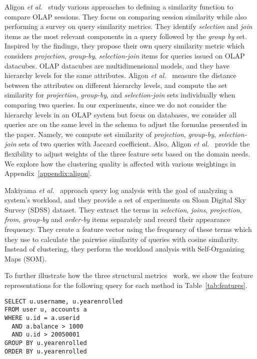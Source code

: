 Aligon \textit{et al.}~\cite{aligon2014similarity} study various approaches to defining a similarity function to compare OLAP sessions.
They focus on comparing session similarity while also performing a survey on query similarity metrics.
They identify \textit{selection} and \textit{join} items as the most relevant components in a query followed by the \textit{group by} set.
Inspired by the findings, they propose their own query similarity metric which considers \textit{projection}, \textit{group-by}, \textit{selection-join} items for queries issued on OLAP datacubes. 
OLAP datacubes are multidimensional models, and they have hierarchy levels for the same attributes. Aligon \textit{et al.}~\cite{aligon2014similarity} measure the distance between the attributes on different hierarchy levels, and compute the set similarity for \textit{projection}, \textit{group-by}, and \textit{selection-join} sets individually when comparing two queries.
In our experiments, since we do not consider the hierarchy levels in an OLAP system but focus on databases, we consider all queries are on the same level in the schema to adjust the formulas presented in the paper. 
Namely, we compute set similarity of \textit{projection}, \textit{group-by}, \textit{selection-join} sets of two queries with Jaccard coefficient. 
Also, Aligon \textit{et al.}~\cite{aligon2014similarity} provide the flexibility to adjust weights of the three feature sets based on the domain needs. We explore how the clustering quality is affected with various weightings in Appendix~\ref{appendix:aligon}.


Makiyama \textit{et al.}~\cite{makiyama2015text} approach query log analysis with the goal of analyzing a system's workload, and they provide a set of experiments on Sloan Digital Sky Survey (SDSS) dataset.
They extract the terms in \textit{selection}, \textit{joins}, \textit{projection}, \textit{from}, \textit{group-by} and \textit{order-by} items separately and record their appearance frequency.
They create a feature vector using the frequency of these terms which they use to calculate the pairwise similarity of queries with cosine similarity.
Instead of clustering, they perform the workload analysis with Self-Organizing Maps (SOM).

To further illustrate how the three structural metrics~\cite{aouiche2006, aligon2014similarity, makiyama2015text} work, we show the feature representations for the following query for each method in Table~\ref{tab:features}.
{\footnotesize
\begin{verbatim}
SELECT u.username, u.yearenrolled
FROM user u, accounts a
WHERE u.id = a.userid
  AND a.balance > 1000
  AND u.id > 20050001
GROUP BY u.yearenrolled
ORDER BY u.yearenrolled
\end{verbatim}
}

